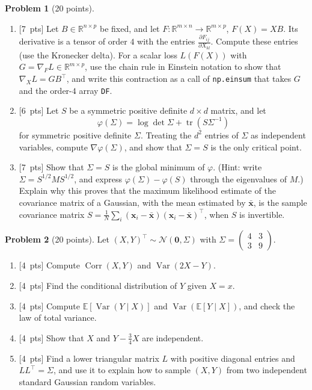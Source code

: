 \documentclass[11pt]{article}
\theoremstyle{definition}
\newtheorem{problem}{Problem}
\newcommand{\pts}[1]{\textup{[#1~pts]}}
\newcommand{\E}{\mathbb{E}}
\DeclareMathOperator{\tr}{tr}
\DeclareMathOperator{\Var}{Var}
\DeclareMathOperator{\Corr}{Corr}
\begin{document}
\begin{problem}[20 points]\label{pr:fin-matrix-calculus}
    \begin{enumerate}[label=(\alph*)]
        \item \pts{7} Let $B \in \mathbb{R}^{n \times p}$ be fixed, and let $F: \mathbb{R}^{m \times n} \to \mathbb{R}^{m \times p}$, $F(X) = XB$. Its derivative is a tensor of order $4$ with the entries $\frac{\partial F_{ij}}{\partial X_{kl}}$. Compute these entries (use the Kronecker delta). For a scalar loss $L(F(X))$ with $G = \nabla_F L \in \mathbb{R}^{m \times p}$, use the chain rule in Einstein notation to show that $\nabla_X L = GB^\top$, and write this contraction as a call of \texttt{np.einsum} that takes $G$ and the order-$4$ array \texttt{DF}.
        \item \pts{6} Let $S$ be a symmetric positive definite $d \times d$ matrix, and let
        \[\varphi(\Sigma) = \log\det\Sigma + \tr(S\Sigma^{-1})\]
        for symmetric positive definite $\Sigma$. Treating the $d^2$ entries of $\Sigma$ as independent variables, compute $\nabla\varphi(\Sigma)$, and show that $\Sigma = S$ is the only critical point.
        \item \pts{7} Show that $\Sigma = S$ is the global minimum of $\varphi$. (Hint: write $\Sigma = S^{1/2}MS^{1/2}$, and express $\varphi(\Sigma) - \varphi(S)$ through the eigenvalues of $M$.) Explain why this proves that the maximum likelihood estimate of the covariance matrix of a Gaussian, with the mean estimated by $\bar{\mathbf{x}}$, is the sample covariance matrix $S = \frac{1}{N}\sum_i(\mathbf{x}_i - \bar{\mathbf{x}})(\mathbf{x}_i - \bar{\mathbf{x}})^\top$, when $S$ is invertible.
    \end{enumerate}
\end{problem}

\begin{problem}[20 points]\label{pr:fin-gaussian}
    Let $(X, Y)^\top \sim \mathcal{N}(\mathbf{0}, \Sigma)$ with $\Sigma = \begin{pmatrix} 4 & 3 \\ 3 & 9 \end{pmatrix}$.
    \begin{enumerate}[label=(\alph*)]
        \item \pts{4} Compute $\Corr(X, Y)$ and $\Var(2X - Y)$.
        \item \pts{4} Find the conditional distribution of $Y$ given $X = x$.
        \item \pts{4} Compute $\E[\Var(Y \mid X)]$ and $\Var(\E[Y \mid X])$, and check the law of total variance.
        \item \pts{4} Show that $X$ and $Y - \frac{3}{4}X$ are independent.
        \item \pts{4} Find a lower triangular matrix $L$ with positive diagonal entries and $LL^\top = \Sigma$, and use it to explain how to sample $(X, Y)$ from two independent standard Gaussian random variables.
    \end{enumerate}
\end{problem}
\end{document}
